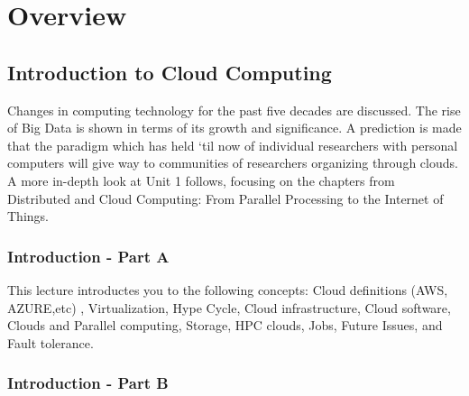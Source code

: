\chapter{Overview}
\label{s:overview}

\FILENAME

\section{Introduction to Cloud Computing}
\label{s:icloud-fundamentals}

Changes in computing technology for the past five decades are discussed.
The rise of Big Data is shown in terms of its growth and significance. A
prediction is made that the paradigm which has held `til now of
individual researchers with personal computers will give way to
communities of researchers organizing through clouds. A more in-depth
look at Unit 1 follows, focusing on the chapters from Distributed and
Cloud Computing: From Parallel Processing to the Internet of Things.

%


\subsection{Introduction - Part A}\label{s:cloud-fundamentals-a}


This lecture introductes you to the following concepts: Cloud
definitions (AWS, AZURE,etc) , Virtualization, Hype Cycle, Cloud
infrastructure, Cloud software, Clouds and Parallel computing,
Storage, HPC clouds, Jobs, Future Issues, and Fault tolerance.

\subsection{Introduction - Part B}\label{s:cloud-fundamentals-b}


